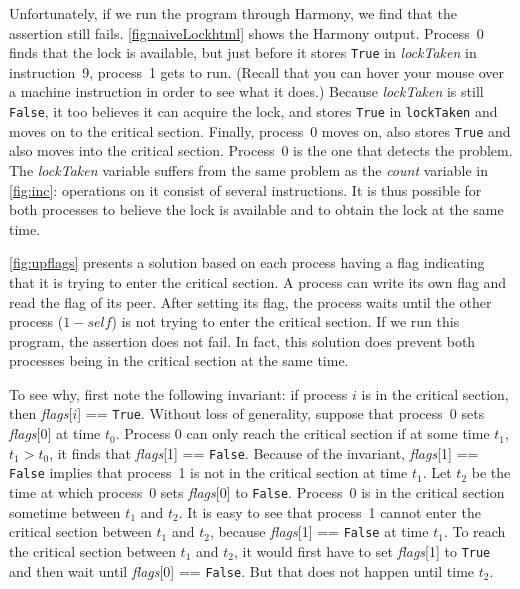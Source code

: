 \documentclass{report}
\begin{document}
Unfortunately, if we run the program through Harmony,
we find that the assertion still fails.
\autoref{fig:naiveLockhtml} shows the Harmony output.
Process~0 finds that the lock is available, but just before it stores
\texttt{True} in \textit{lockTaken} in instruction~9, process~1 gets
to run.
(Recall that you can hover your mouse over a machine instruction in order
to see what it does.)
Because \textit{lockTaken} is still \texttt{False}, it too
believes it can acquire the lock, and stores \texttt{True} in
\texttt{lockTaken} and moves on to the critical section.
Finally, process~0 moves on, also stores \texttt{True} and also moves
into the critical section.  Process~0 is the one that detects the
problem.
The \textit{lockTaken} variable
suffers from the same problem as the \textit{count} variable
in \autoref{fig:inc}: operations
on it consist of several instructions.  It is thus possible
for both processes to believe the lock is available and to obtain the lock
at the same time.

\autoref{fig:upflags} presents a solution based on each process having
a flag indicating that it is trying to enter the critical section.
A process can write its own flag and read the flag of its peer.
After setting its flag, the process waits until the other process
($1 - \mathit{self}$) is not trying to enter the critical section.
If we run this program, the assertion does not fail.  In fact, this
solution does prevent both processes being in the critical section at
the same time.

To see why, first note the following invariant: if process $i$ is in the
critical section, then \textit{flags}[$i$] == \texttt{True}.
Without loss of generality,
suppose that process~0 sets \textit{flags}[0] at time $t_0$.
Process 0 can only reach the critical section if at some time $t_1$,
$t_1 > t_0$, it finds that \textit{flags}[1] == \texttt{False}.
Because of the invariant, \textit{flags}[1] == \texttt{False} implies that
process~1 is not in the critical section at time $t_1$.
Let $t_2$ be the time at which process~0 sets \textit{flags}[0]
to \texttt{False}.  Process~0 is in the critical section sometime
between $t_1$ and $t_2$.
It is easy to see that process~1 cannot enter the critical section
between $t_1$ and $t_2$, because \textit{flags}[1] == \texttt{False} at
time $t_1$.  To reach the critical section between $t_1$ and $t_2$,
it would first have to set \textit{flags}[1] to \texttt{True} and
then wait until \textit{flags}[0] == \texttt{False}.  But that does not happen
until time $t_2$.
\end{document}
